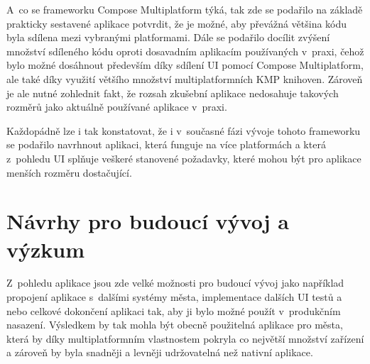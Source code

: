 \medskip

A~co se frameworku Compose Multiplatform týká, tak zde se podařilo na základě prakticky sestavené aplikace potvrdit, že je možné, 
aby převážná většina kódu byla sdílena mezi vybranými platformami. Dále se podařilo docílit zvýšení množství sdíleného kódu oproti 
dosavadním aplikacím používaných v~praxi, čehož bylo možné dosáhnout především díky sdílení UI pomocí Compose Multiplatform,
ale také díky využití většího množství multiplatformních KMP knihoven. 
Zároveň je ale nutné zohlednit fakt, že rozsah zkušební aplikace nedosahuje 
takových rozměrů jako aktuálně používané aplikace v~praxi. 

Každopádně lze i tak konstatovat, že i v~současné fázi vývoje tohoto frameworku se podařilo navrhnout
aplikaci, která funguje na více platformách a která z~pohledu UI splňuje veškeré stanovené požadavky, které mohou být pro aplikace 
menších rozměru dostačující. 

\bigskip

\section{Návrhy pro budoucí vývoj a výzkum}
Z~pohledu aplikace jsou zde velké možnosti pro budoucí vývoj jako například propojení aplikace s~dalšími systémy města,
implementace dalších UI testů a nebo celkové dokončení aplikaci tak, aby ji bylo možné použít v~produkčním nasazení. Výsledkem by tak mohla 
být obecně použitelná aplikace pro města, která by díky multiplatformním vlastnostem pokryla co největší množství zařízení a zároveň by 
byla snadněji a levněji udržovatelná než nativní aplikace.






